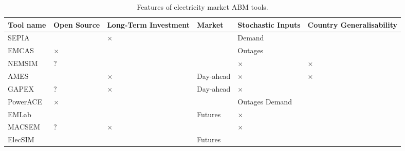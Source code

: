 \documentclass[12pt]{article}
\begin{document}
\begin{table}[]
	\begin{tabular}{m{2.5cm}m{1.2cm}m{1.5cm}m{2cm}m{2cm}m{2cm}} \toprule
		\multicolumn{1}{c}{\textbf{Tool name}} & \textbf{Open Source} & \textbf{Long-Term Investment} & \textbf{Market} & \textbf{Stochastic Inputs} & \textbf{Country Generalisability} \\ \midrule
		SEPIA \cite{Harp2000}  & \checkmark           & $\times$                             & \checkmark      & Demand                     & \checkmark                        \\ 
		EMCAS ~\cite{Conzelmann}   & $\times$                    & \checkmark                    & \checkmark      & Outages                    & \checkmark                        \\ 
		NEMSIM ~\cite{Batten2006}  & ?              & \checkmark                    & \checkmark      & $\times$                          & $\times$                                 \\ 
		AMES  ~\cite{Sun2007} & \checkmark           & $\times$                             & Day-ahead       & $\times$                          & $\times$                                 \\ 
		GAPEX  ~\cite{Cincotti2013} & ?              & $\times$                             & Day-ahead       & $\times$                          & \checkmark                        \\ 
		PowerACE \cite{Rothengatter2007} & $\times$                    & \checkmark                    & \checkmark      & Outages Demand             & \checkmark                        \\ 

		EMLab ~\cite{Chappin2017}  & \checkmark           & \checkmark                    & Futures         & $\times$                          & \checkmark                        \\ 
		MACSEM  ~\cite{Praca2003}  & ?              & $\times$                             & \checkmark      & $\times$                          & \checkmark                        \\ 
		ElecSIM                                  & \checkmark           & \checkmark                    & Futures         & \checkmark                 & \checkmark                        \\ \hline
	\end{tabular}
	\caption{Features of electricity market ABM tools.}
	\label{table:tool_comparison}
\end{table}
\end{document}
